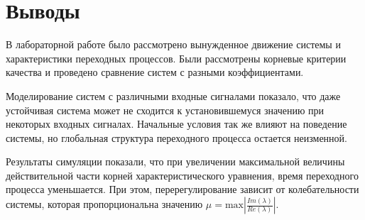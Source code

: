 
\FloatBarrier

\FloatBarrier

\section{Выводы}
В лабораторной работе было рассмотрено вынужденное движение системы и характеристики переходных процессов.
Были рассмотрены корневые критерии качества и проведено сравнение систем с разными коэффициентами.

Моделирование систем с различными входные сигналами показало, что 
даже устойчивая система может не сходится к установившемуся значению при некоторых входных сигналах. 
Начальные условия так же влияют на поведение системы, но глобальная структура переходного процесса остается неизменной.

Результаты симуляции показали, что при увеличении максимальной величины действительной части корней 
характеристического уравнения, время переходного процесса уменьшается.
При этом, перерегулирование зависит от колебательности системы, которая пропорциональна значению $\mu = \text{max}\left|\frac{Im(\lambda)}{Re(\lambda)}\right|$.

